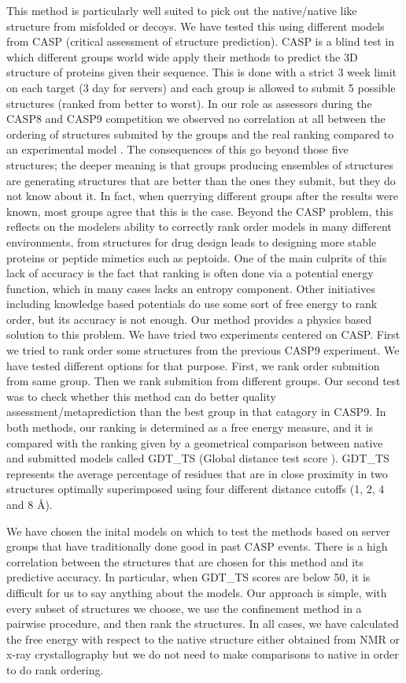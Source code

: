 \documentclass[12pt]{article}
\begin{document}
This method is particularly well suited to pick out the native/native like structure from misfolded or decoys. We have
tested this using different models from CASP (critical assessment of structure
prediction). CASP is a blind test in which different groups world wide apply their
methods to predict the 3D structure of proteins given their sequence. This is done with a strict 3
week limit on each target (3 day for servers) and each group is allowed to submit 5 possible
structures (ranked from better to worst). In our role as assessors during the CASP8 and CASP9 \cite{MacCallum2011}
competition we observed no correlation at all between the ordering of structures submited by the
groups and the real ranking compared to an experimental model \cite{Kryshtafovych2011}. The consequences of this go beyond
those five structures; the deeper meaning is that groups producing ensembles of structures are
generating structures that are better than the ones they submit, but they do not know about it. In
fact, when querrying different groups after the results were known, most groups agree that this is
the case. Beyond the CASP problem, this reflects on the modelers ability to correctly rank order
models in many different environments, from structures for drug design leads to designing more
stable proteins or peptide mimetics such as peptoids. One of the main culprits of this lack of
accuracy is the fact that ranking is often done via a potential energy function, which in many cases
lacks an entropy component. Other initiatives including knowledge based potentials do use some sort
of free energy to rank order, but its accuracy is not enough. Our method provides a physics based
solution to this problem. We have tried two experiments centered on CASP. First we tried to rank
order some structures from the previous CASP9 experiment. We have tested different options for that purpose.
First, we rank order submition from same group. Then we rank submition from different groups. Our second test was 
to check whether this method can do better quality assessment/metaprediction than the best group in that catagory in CASP9. 
In both methods, our ranking is determined as a free energy measure,
and it is compared with the ranking given by a geometrical comparison between native and submitted
models called GDT\_TS (Global distance test score \cite{Zemla2003}). 
GDT\_TS represents the average percentage of residues that are in close proximity in two
structures optimally superimposed using four different distance cutoffs (1, 2, 4 and 8 Å).

We have chosen the inital models on which to test the methods based on server groups that have
traditionally done good in past CASP events. There is a high correlation between the structures that
are chosen for this method and its predictive accuracy. In particular, when GDT\_TS scores are below
50, it is difficult for us to say anything about the models. Our approach is simple, with every
subset of structures we choose, we use the confinement method in a pairwise procedure, and then rank
the structures. In all cases, we have calculated the free energy with respect to the native structure either obtained from NMR or 
x-ray crystallography but we do not need to make comparisons to native in order to do rank ordering.
\end{document}
